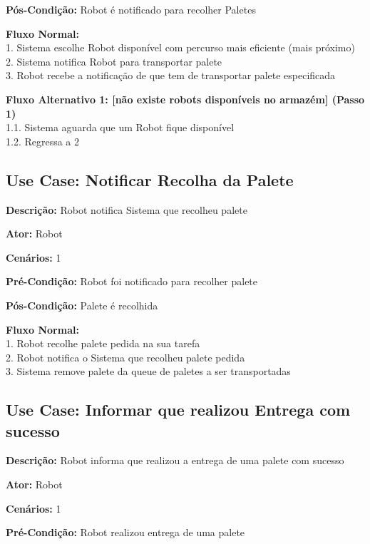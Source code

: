 \documentclass[11pt]{article}
\begin{document}
\textbf{Pós-Condição:} Robot é notificado para recolher Paletes

\textbf{Fluxo Normal:}\\
        1. Sistema escolhe Robot disponível com percurso mais eficiente (mais próximo)\\
        2. Sistema notifica Robot para transportar palete\\
        3. Robot recebe a notificação de que tem de transportar palete especificada

        
\textbf{Fluxo Alternativo 1: [não existe robots disponíveis no armazém] (Passo 1)}\\
        1.1. Sistema aguarda que um Robot fique disponível\\
        1.2. Regressa a 2
   
   
\vspace{3cm} 
   
        
\subsection{Use Case: Notificar Recolha da Palete}

\textbf{Descrição:} Robot notifica Sistema que recolheu palete

\textbf{Ator:} Robot

\textbf{Cenários:} 1

\textbf{Pré-Condição:} Robot foi notificado para recolher palete

\textbf{Pós-Condição:} Palete é recolhida

\textbf{Fluxo Normal:}\\
        1. Robot recolhe palete pedida na sua tarefa\\
	    2. Robot notifica o Sistema que recolheu palete pedida\\
	    3. Sistema remove palete da queue de paletes a ser transportadas


\vspace{3cm}

	    
\subsection{Use Case: Informar que realizou Entrega com sucesso}

\textbf{Descrição:} Robot informa que realizou a entrega de uma palete com sucesso

\textbf{Ator:} Robot

\textbf{Cenários:} 1

\textbf{Pré-Condição:} Robot realizou entrega de uma palete
\end{document}
